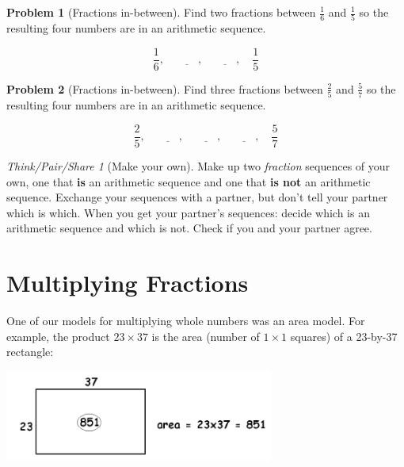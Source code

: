 \documentclass[10pt, reqno]{amsart}
\theoremstyle{remark}
\newtheorem*{thinkpair*}{Think/Pair/Share}
\theoremstyle{definition}
\newtheorem{problem}{Problem}
\numberwithin{equation}{section}  %
\begin{document}
\begin{problem}[Fractions in-between]
Find two fractions between $\frac 1 6$ and $\frac 1 5$ so the resulting four numbers are in an arithmetic sequence.


\[
\frac 1 6, \quad \underline{\qquad}, \quad  \underline{\qquad}, \quad \frac 1 5
\]



\end{problem}



\begin{problem}[Fractions in-between]
Find three fractions between $\frac 2 5$ and $\frac 5 7$ so the resulting four numbers are in an arithmetic sequence.

\[
\frac 2 5, \quad \underline{\qquad}, \quad \underline{\qquad}, \quad  \underline{\qquad}, \quad \frac 5 7 
\]





\end{problem}


\begin{thinkpair*}[Make your own]
Make up two \emph{fraction} sequences of your own, one that {\bf is} an arithmetic sequence and one that {\bf is not} an arithmetic sequence.  Exchange your sequences with a partner, but don't tell your partner which is which.  When you get your partner's sequences: decide which is an arithmetic sequence and which is not.  Check if you and your partner agree.

\end{thinkpair*}








\section{Multiplying Fractions}

One of our models for  multiplying whole numbers was  an area model. For
example, the product $23\times 37$ is the area (number of $1\times 1 $ squares) of a 23-by-37 rectangle:
\begin{center}
\includegraphics[height = 3cm]{areamodel1}
\end{center}
\end{document}
